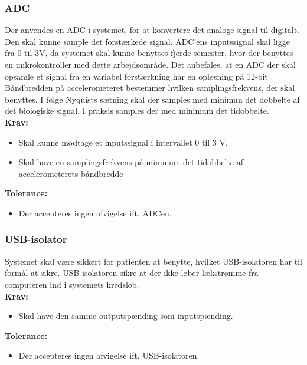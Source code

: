 \subsubsection{ADC}
Der anvendes en ADC i systemet, for at konvertere det analoge signal til digitalt. Den skal kunne sample det forstærkede signal. ADC'ens inputssignal skal ligge fra 0 til 3V, da systemet skal kunne benyttes fjerde semester, hvor der benyttes en mikrokontroller med dette arbejdsområde. Det anbefales, at en ADC der skal opsamle et signal fra en variabel forstærkning har en opløsning på 12-bit \cite{Zouridakis2003}. Båndbredden på accelerometeret bestemmer hvilken samplingsfrekvens, der skal benyttes. I følge Nyquists sætning skal der samples med minimun det dobbelte af det biologiske signal. I praksis samples der med minimum det tidobbelte. \\
\textbf{Krav:}
\begin{itemize}
\item Skal kunne modtage et inputssignal i intervallet 0 til 3 V.
\item Skal have en samplingsfrekvens på minimum det tidobbelte af accelerometerets båndbredde
\end{itemize}
\textbf{Tolerance:}
\begin{itemize}
\item Der accepteres ingen afvigelse ift. ADCen.
\end{itemize}

\subsubsection{USB-isolator}
Systemet skal være sikkert for patienten at benytte, hvilket USB-isolatoren har til formål at sikre. USB-isolatoren sikre at der ikke løber lækstrømme fra computeren ind i systemets kredsløb.\\
\textbf{Krav:}
\begin{itemize}
\item Skal have den samme outputspænding som inputspænding. 
\end{itemize}
\textbf{Tolerance:}
\begin{itemize}
\item Der accepteres ingen afvigelse ift. USB-isolatoren. 
\end{itemize}

